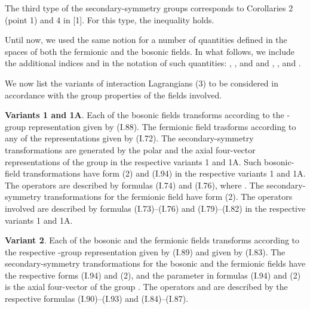 \documentclass[a4paper,12pt]{article}
\begin{document}
The third type of the secondary-symmetry groups corresponds to Corollaries 2
(point 1) and 4 in [1]. For this type, the inequality 
\coordHE{} holds.

Until now, we used the same notion for a number of quantities defined in the
spaces of both the fermionic and the bosonic fields. In what follows, we
include the additional indices \coordHE{} and \coordHE{} in the notation of such quantities:
\coordHE{}, \coordHE{}, and \coordHE{} and \coordHE{}, \coordHE{}, and 
\coordHE{}. 

We now list the variants of interaction Lagrangians (3) to be considered in
accordance with the group properties of the fields involved.

{\bf Variants 1 and 1A}. Each of the bosonic fields transforms according to the
\coordHE{}-group representation \coordHE{} given by (I.88). The fermionic
field trasforms according to any of the representations \coordHE{} given by 
(I.72). The secondary-symmetry transformations are generated by the polar and 
the axial four-vector representations of the group \coordHE{} in the 
respective variants 1 and 1A. Such bosonic-field transformations have form (2) 
and (I.94) in the respective variants 1 and 1A. The operators \coordHE{} are 
described by formulas (I.74) and (I.76), where \coordHE{}. The 
secondary-symmetry transformations for the fermionic field have form (2). The 
operators \coordHE{} involved are described by formulas (I.73)--(I.76) and 
(I.79)--(I.82) in the respective variants 1 and 1A.

{\bf Variant 2}. Each of the bosonic and the fermionic fields transforms 
according to the respective \coordHE{}-group representation
\coordHE{} given by (I.89) and \coordHE{} given by (I.83). The secondary-symmetry 
transformations for the bosonic and the fermionic fields have the respective
forms (I.94) and (2), and the parameter \myHighlight{$\theta_{\mu}$}\coordHE{} in formulas (I.94) and
(2) is the axial four-vector of the group \coordHE{}. The operators
\coordHE{} and \coordHE{} are described by the respective formulas
(I.90)--(I.93) and (I.84)--(I.87).
\end{document}
